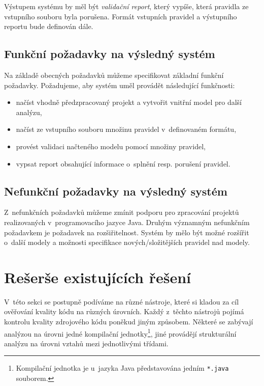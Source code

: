 Výstupem systému by měl být \emph{validační report}, který vypíše, která pravidla ze vstupního souboru byla porušena. Formát vstupních pravidel a výstupního reportu bude definován dále.

\subsection{Funkční požadavky na výsledný systém}

Na základě obecných požadavků můžeme specifikovat základní funkční požadavky. Požadujeme, aby systém uměl provádět následující funkčnosti:
\begin{itemize}
\item načíst vhodně předzpracovaný projekt a vytvořit vnitřní model pro další analýzu,
\item načíst ze vstupního souboru množinu pravidel v~definovaném formátu,
\item provést validaci načteného modelu pomocí množiny pravidel,
\item vypsat report obsahující informace o~splnění resp. porušení pravidel.
\end{itemize}

\subsection{Nefunkční požadavky na výsledný systém}
Z~nefunkčních požadavků můžeme zmínit podporu pro zpracování projektů realizovaných v~programovacího jazyce Java. Druhým významným nefunkčním požadavkem je požadavek na rozšiřitelnost. Systém by mělo být možné rozšířit o~další modely a možnosti specifikace nových/složitějších pravidel nad modely.

\section{Rešerše existujících řešení}
\label{requirements-existing_tools}

V~této sekci se postupně podíváme na různé nástroje, které si kladou za cíl ověřování kvality kódu na různých úrovních. Každý z~těchto nástrojů pojímá kontrolu kvality zdrojového kódu poněkud jiným způsobem. Některé se zabývají  analýzou na úrovni jedné kompilační jednotky\footnote{Kompilační jednotka je u~jazyka Java představována jedním \verb-*.java- souborem.}, jiné provádějí strukturální analýzu na úrovni vztahů mezi jednotlivými třídami.

